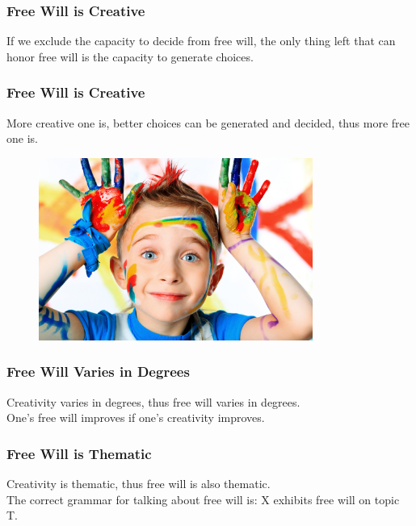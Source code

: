 \documentclass[xcolor=dvipsnames]{beamer}
\theoremstyle{definition}
\begin{document}
\begin{frame}[fragile]
  \frametitle{Free Will is Creative}

  If we exclude the \alert{capacity to decide} from free will, the only thing left that can honor free will is \alert{the capacity to generate choices}.
\end{frame}

\begin{frame}[fragile]
  \frametitle{Free Will is Creative}

  More creative one is, better choices can be generated and decided, thus more free one is.

  \begin{figure}
    \centering
    \includegraphics[width=0.8\textwidth]{images/creativity.jpg}\\
  \end{figure}
\end{frame}

\begin{frame}[fragile]
  \frametitle{Free Will Varies in Degrees}

  Creativity varies in degrees, thus free will \alert{varies in degrees}.\\[0.5cm]

  One's free will improves if one's creativity improves.
\end{frame}

\begin{frame}[fragile]
  \frametitle{Free Will is Thematic}

  Creativity is thematic, thus free will is also \alert{thematic}.\\[0.5cm]

  The correct grammar for talking about free will is: \alert{X exhibits free will on topic T}.
\end{frame}
\end{document}
